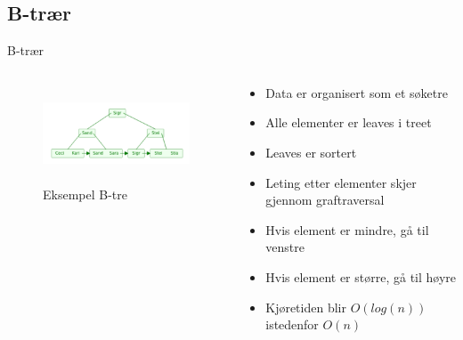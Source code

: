 \subsection*{B-trær}
\begin{frame}{B-trær}
    \begin{columns}
    \begin{column}{0.48\textwidth}
    \begin{figure}
        \includegraphics[height = 2.9cm]{images/btre.png}
        \caption{Eksempel B-tre}
        \label{fig:btree}
    \end{figure}
    \end{column}
    \begin{column}{0.48\textwidth}
    \begin{itemize}[<+->]
        \item Data er organisert som et søketre
        \item Alle elementer er leaves i treet 
        \item Leaves er sortert
        \item Leting etter elementer skjer gjennom graftraversal
        \item Hvis element er mindre, gå til venstre
        \item Hvis element er større, gå til høyre
        \item Kjøretiden blir $O(log(n))$ istedenfor $O(n)$
    \end{itemize}
    \end{column}
    \end{columns}
\end{frame}

